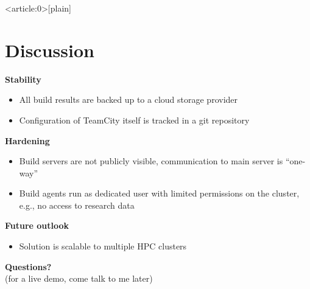 \documentclass[english,xcolor=pst,11pt]{beamer}
\begin{document}
{ %
    \begin{frame}<article:0>[plain]
     \end{frame}
}

\section{Discussion}
\begin{frame}
 \textbf{Stability}
 \begin{itemize}
  \item All build results are backed up to a cloud storage provider
  \item Configuration of TeamCity itself is tracked in a git repository
  \end{itemize}
  \textbf{Hardening}
  \begin{itemize}
  \item Build servers are not publicly visible, communication to main server is ``one-way''
  \item Build agents run as dedicated  user with limited permissions on the cluster, e.g., no access to research data
 \end{itemize}
 \textbf{Future outlook}

 \begin{itemize}
  \item Solution is scalable to multiple HPC clusters
 \end{itemize}

\end{frame}


\begin{frame}
 \Large{\textbf{Questions?}} \\ \vfill
 \small{(for a live demo, come talk to me later)}
\end{frame}
\end{document}
